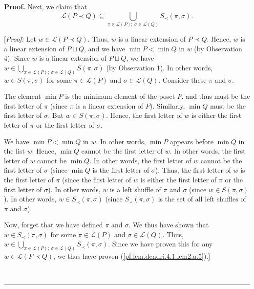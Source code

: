 \documentclass[numbers=enddot,12pt,final,onecolumn,notitlepage]{scrartcl}%
\theoremstyle{definition}
\newenvironment{proof}[1][Proof]{\noindent\textbf{#1.} }{\ \rule{0.5em}{0.5em}}
\newenvironment{verlong}{}{}
\begin{document}
\begin{verlong}
\begin{proof}
Next, we claim that
\begin{equation}
\mathcal{L}\left(  P\left.  \prec\right.  Q\right)  \subseteq\bigcup_{\pi
\in\mathcal{L}\left(  P\right)  ;\ \sigma\in\mathcal{L}\left(  Q\right)
}S_{\prec}\left(  \pi,\sigma\right)  .\label{pf.lem.dendri.4.1.lem2.a.5}%
\end{equation}


[\textit{Proof:} Let $w\in\mathcal{L}\left(  P\left.  \prec\right.  Q\right)
$. Thus, $w$ is a linear extension of $P\left.  \prec\right.  Q$. Hence, $w$
is a linear extension of $P\sqcup Q$, and we have $\min P<\min Q$ in $w$ (by
Observation 4). Since $w$ is a linear extension of $P\sqcup Q$, we have
$w\in\bigcup_{\pi\in\mathcal{L}\left(  P\right)  ;\ \sigma\in\mathcal{L}%
\left(  Q\right)  }S\left(  \pi,\sigma\right)  $ (by Observation 1). In other
words, $w\in S\left(  \pi,\sigma\right)  $ for some $\pi\in\mathcal{L}\left(
P\right)  $ and $\sigma\in\mathcal{L}\left(  Q\right)  $. Consider these $\pi$
and $\sigma$.

The element $\min P$ is the minimum element of the poset $P$, and thus must be
the first letter of $\pi$ (since $\pi$ is a linear extension of $P$).
Similarly, $\min Q$ must be the first letter of $\sigma$. But $w\in S\left(
\pi,\sigma\right)  $. Hence, the first letter of $w$ is either the first
letter of $\pi$ or the first letter of $\sigma$.

We have $\min P<\min Q$ in $w$. In other words, $\min P$ appears before $\min
Q$ in the list $w$. Hence, $\min Q$ cannot be the first letter of $w$. In
other words, the first letter of $w$ cannot be $\min Q$. In other words, the
first letter of $w$ cannot be the first letter of $\sigma$ (since $\min Q$ is
the first letter of $\sigma$). Thus, the first letter of $w$ is the first
letter of $\pi$ (since the first letter of $w$ is either the first letter of
$\pi$ or the first letter of $\sigma$). In other words, $w$ is a left shuffle
of $\pi$ and $\sigma$ (since $w\in S\left(  \pi,\sigma\right)  $). In other
words, $w\in S_{\prec}\left(  \pi,\sigma\right)  $ (since $S_{\prec}\left(
\pi,\sigma\right)  $ is the set of all left shuffles of $\pi$ and $\sigma$).

Now, forget that we have defined $\pi$ and $\sigma$. We thus have shown that
$w\in S_{\prec}\left(  \pi,\sigma\right)  $ for some $\pi\in\mathcal{L}\left(
P\right)  $ and $\sigma\in\mathcal{L}\left(  Q\right)  $. Thus, $w\in
\bigcup_{\pi\in\mathcal{L}\left(  P\right)  ;\ \sigma\in\mathcal{L}\left(
Q\right)  }S_{\prec}\left(  \pi,\sigma\right)  $. Since we have proven this
for any $w\in\mathcal{L}\left(  P\left.  \prec\right.  Q\right)  $, we thus
have proven (\ref{pf.lem.dendri.4.1.lem2.a.5}).]


\end{proof}
\end{verlong}
\end{document}
